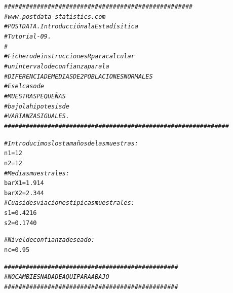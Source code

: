 \documentclass[10pt,a4paper]{article}\usepackage[]{graphicx}\usepackage[]{color}
\makeatletter
\newcommand{\hlnum}[1]{\textcolor[rgb]{0.686,0.059,0.569}{#1}}%
\newcommand{\hlcom}[1]{\textcolor[rgb]{0.678,0.584,0.686}{\textit{#1}}}%
\newcommand{\hlstd}[1]{\textcolor[rgb]{0.345,0.345,0.345}{#1}}%
\newcommand{\hlkwb}[1]{\textcolor[rgb]{0.69,0.353,0.396}{#1}}%
\newenvironment{kframe}{%
 \def\at@end@of@kframe{}%
 \ifinner\ifhmode%
  \def\at@end@of@kframe{\end{minipage}}%
  \begin{minipage}{\columnwidth}%
 \fi\fi%
 \def\FrameCommand##1{\hskip\@totalleftmargin \hskip-\fboxsep
 \colorbox{shadecolor}{##1}\hskip-\fboxsep
     \hskip-\linewidth \hskip-\@totalleftmargin \hskip\columnwidth}%
 \MakeFramed {\advance\hsize-\width
   \@totalleftmargin\z@ \linewidth\hsize
   \@setminipage}}%
 {\par\unskip\endMakeFramed%
 \at@end@of@kframe}
\newenvironment{knitrout}{}{} %
\makeatother
\begin{document}
\begin{knitrout}
\color{fgcolor}\begin{kframe}
\begin{alltt}
\hlcom{####################################################}
\hlcom{# www.postdata-statistics.com}
\hlcom{# POSTDATA. Introducción a la Estadísitica}
\hlcom{# Tutorial-09.}
\hlcom{#}
\hlcom{# Fichero de instrucciones R para calcular}
\hlcom{# un intervalo de confianza para la}
\hlcom{# DIFERENCIA DE MEDIAS DE 2 POBLACIONES NORMALES}
\hlcom{# Es el caso de}
\hlcom{# MUESTRAS PEQUEÑAS}
\hlcom{# bajo la hipotesis de}
\hlcom{# VARIANZAS IGUALES.}
\hlcom{##############################################################}

\hlcom{# Introducimos los tamaños de las muestras:}
\hlstd{n1} \hlkwb{=} \hlnum{12}
\hlstd{n2} \hlkwb{=} \hlnum{12}
\hlcom{# Medias muestrales:}
\hlstd{barX1} \hlkwb{=} \hlnum{1.914}
\hlstd{barX2} \hlkwb{=} \hlnum{2.344}
\hlcom{# Cuasidesviaciones tipicas muestrales:}
\hlstd{s1} \hlkwb{=} \hlnum{0.4216}
\hlstd{s2} \hlkwb{=} \hlnum{0.1740}

\hlcom{# Nivel de confianza deseado:}
\hlstd{nc} \hlkwb{=} \hlnum{0.95}

\hlcom{################################################}
\hlcom{#NO CAMBIES NADA DE AQUI PARA ABAJO}
\hlcom{################################################}


\end{alltt}
\end{kframe}
\end{knitrout}
\end{document}
